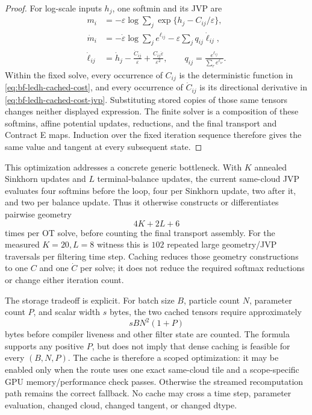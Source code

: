 \begin{proof}
For log-scale inputs \(h_j\), one softmin and its JVP are
\begin{align*}
  m_i
  &=-\varepsilon\log\sum_j
    \exp\{h_j-C_{ij}/\varepsilon\},\\
  \dot m_i
  &=-\dot\varepsilon\log\sum_j e^{\ell_{ij}}
    -\varepsilon\sum_j q_{ij}\dot\ell_{ij},\\
  \dot\ell_{ij}
  &=\dot h_j-\frac{\dot C_{ij}}{\varepsilon}
    +\frac{C_{ij}\dot\varepsilon}{\varepsilon^2},
  \qquad
  q_{ij}=\frac{e^{\ell_{ij}}}{\sum_r e^{\ell_{ir}}}.
\end{align*}
Within the fixed solve, every occurrence of \(C_{ij}\) is the deterministic
function in \eqref{eq:bf-ledh-cached-cost}, and every occurrence of
\(\dot C_{ij}\) is its directional derivative in
\eqref{eq:bf-ledh-cached-cost-jvp}.  Substituting stored copies of those same
tensors changes neither displayed expression.  The finite solver is a
composition of these softmins, affine potential updates, reductions, and the
final transport and Contract E maps.  Induction over the fixed iteration
sequence therefore gives the same value and tangent at every subsequent state.
\end{proof}

This optimization addresses a concrete generic bottleneck.  With \(K\)
annealed Sinkhorn updates and \(L\) terminal-balance updates, the current
same-cloud JVP evaluates four softmins before the loop, four per Sinkhorn
update, two after it, and two per balance update.  Thus it otherwise constructs
or differentiates pairwise geometry
\[
  4K+2L+6
\]
times per OT solve, before counting the final transport assembly.  For the
measured \(K=20,L=8\) witness this is \(102\) repeated large geometry/JVP
traversals per filtering time step.  Caching reduces those geometry
constructions to one \(C\) and one \(\dot C\) per solve; it does not reduce the
required softmax reductions or change either iteration count.

The storage tradeoff is explicit.  For batch size \(B\), particle count \(N\),
parameter count \(P\), and scalar width \(s\) bytes, the two cached tensors
require approximately
\begin{equation}
\label{eq:bf-ledh-cached-memory}
  s B N^2(1+P)
\end{equation}
bytes before compiler liveness and other filter state are counted.  The formula
supports any positive \(P\), but does not imply that dense caching is feasible
for every \((B,N,P)\).  The cache is therefore a scoped optimization: it may be
enabled only when the route uses one exact same-cloud tile and a scope-specific
GPU memory/performance check passes.  Otherwise the streamed recomputation path
remains the correct fallback.  No cache may cross a time step, parameter
evaluation, changed cloud, changed tangent, or changed dtype.

